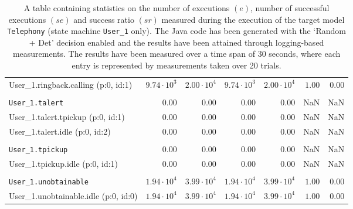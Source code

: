 \begin{table}[htbp]
{\begin{tabular}{lrrrrrr}
\hspace{3mm}User\_1.ringback.calling (p:0, id:1)     & $9.74 \cdot 10^{3}$ & $2.00 \cdot 10^{4}$ & $9.74 \cdot 10^{3}$ & $2.00 \cdot 10^{4}$ &               $1.00$ &               $0.00$ \\
\\[-8pt]\texttt{User\_1.talert}                      &              $0.00$ &              $0.00$ &              $0.00$ &              $0.00$ &                  NaN &                  NaN \\
\hspace{3mm}User\_1.talert.tpickup (p:0, id:1)       &              $0.00$ &              $0.00$ &              $0.00$ &              $0.00$ &                  NaN &                  NaN \\
\hspace{3mm}User\_1.talert.idle (p:0, id:2)          &              $0.00$ &              $0.00$ &              $0.00$ &              $0.00$ &                  NaN &                  NaN \\
\\[-8pt]\texttt{User\_1.tpickup}                     &              $0.00$ &              $0.00$ &              $0.00$ &              $0.00$ &                  NaN &                  NaN \\
\hspace{3mm}User\_1.tpickup.idle (p:0, id:1)         &              $0.00$ &              $0.00$ &              $0.00$ &              $0.00$ &                  NaN &                  NaN \\
\\[-8pt]\texttt{User\_1.unobtainable}                & $1.94 \cdot 10^{4}$ & $3.99 \cdot 10^{4}$ & $1.94 \cdot 10^{4}$ & $3.99 \cdot 10^{4}$ &               $1.00$ &               $0.00$ \\
\hspace{3mm}User\_1.unobtainable.idle (p:0, id:0)    & $1.94 \cdot 10^{4}$ & $3.99 \cdot 10^{4}$ & $1.94 \cdot 10^{4}$ & $3.99 \cdot 10^{4}$ &               $1.00$ &               $0.00$ \\
\bottomrule
\end{tabular}
}
\caption{A table containing statistics on the number of executions $(e)$, number of successful executions $(se)$ and success ratio $(sr)$ measured during the execution of the target model \texttt{Telephony} (state machine \texttt{User\_1} only). The Java code has been generated with the `Random + Det' decision enabled and the results have been attained through logging-based measurements. The results have been measured over a time span of 30 seconds, where each entry is represented by measurements taken over 20 trials.}
\label{table:frequency_results_telephony_logging_user_1}
\end{table}